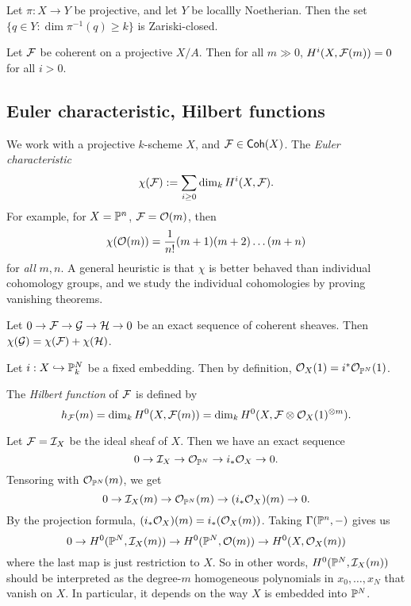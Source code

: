 \documentclass[11pt]{amsart}
\begin{document}
\begin{prop}
    Let $\pi:X\to Y$ be projective, and let $Y$ be locallly Noetherian. Then the set $\{q\in Y: \dim \pi^{-1}(q) \ge k\}$ is Zariski-closed.
\end{prop}

\begin{thm}
    Let $\mathcal{F}$ be coherent on a projective $X/A$. Then for all $m\gg 0$, $H^i(X, \mathcal{F}(m)) = 0$ for all $i>0$. 
\end{thm}

\subsection{Euler characteristic, Hilbert functions}

We work with a projective $k$-scheme $X$, and $\mathcal{F}\in \mathsf{Coh}(X)$. The \emph{Euler characteristic} 
\[\chi(\mathcal{F}) := \sum_{i \ge 0} \dim_k H^i(X, \mathcal{F}).\]
For example, for $X=\mathbb{P}^n$, $\mathcal{F} = \mathcal{O}(m)$, then
\[\chi(\mathcal{O}(m)) = \frac{1}{n!}(m+1)(m+2)\dots (m+n)\]
for \emph{all} $m,n$. A general heuristic is that $\chi$ is better behaved than individual cohomology groups, and we study the individual cohomologies by proving vanishing theorems.

\begin{prop}
    Let $0\to \mathcal{F}\to \mathcal{G}\to \mathcal{H}\to 0$ be an exact sequence of coherent sheaves. Then $\chi(\mathcal{G}) = \chi(\mathcal{F}) + \chi(\mathcal{H})$.
\end{prop}

Let $i:X\hookrightarrow \mathbb{P}_k^N$ be a fixed embedding. Then by definition, $\mathcal{O}_X(1) = i^\ast \mathcal{O}_{\mathbb{P}^N}(1)$. 

\begin{defn}
    The \emph{Hilbert function} of $\mathcal{F}$ is defined by
    \[h_{\mathcal{F}}(m) = \dim_k H^0(X, \mathcal{F}(m)) =  \dim_k H^0(X, \mathcal{F}\otimes \mathcal{O}_X(1)^{\otimes m}).\]
\end{defn}

\begin{exm}
    Let $\mathcal{F} = \mathcal{I}_X$ be the ideal sheaf of $X$. Then we have an exact sequence
    \[0\to \mathcal{I}_X \to \mathcal{O}_{\mathbb{P}^N} \to i_\ast \mathcal{O}_X \to 0.\]
    Tensoring with $\mathcal{O}_{\mathbb{P}^N}(m)$, we get
    \[0\to \mathcal{I}_X(m) \to \mathcal{O}_{\mathbb{P}^N}(m) \to (i_\ast \mathcal{O}_X)(m) \to 0.\]
    By the projection formula, $(i_\ast \mathcal{O}_X)(m) = i_\ast(\mathcal{O}_X(m))$. Taking $\Gamma(\mathbb{P}^n,-)$ gives us
    \[0\to H^0(\mathbb{P}^N, \mathcal{I}_X(m)) \to H^0(\mathbb{P}^N, \mathcal{O}(m)) \to H^0(X, \mathcal{O}_X(m))\]
    where the last map is just restriction to $X$.
    So in other words, $H^0(\mathbb{P}^N, \mathcal{I}_X(m))$ should be interpreted as the degree-$m$ homogeneous polynomials in $x_0,\dots,x_N$ that vanish on $X$. In particular, it depends on the way $X$ is embedded into $\mathbb{P}^N$.
\end{exm}
\end{document}
